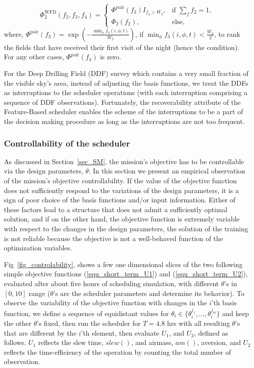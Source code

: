 \documentclass[12pt]{aastex62}
\theoremstyle{definition}
\begin{document}
\begin{equation*}
\Phi_2^{\text{WFD}}(f_2,f_3,f_4) =\begin{cases} \Phi^{\text{pair}}(f_3)I_{f_4> W_2},& \text{if } \sum\limits_{f}{f_2} = 1,\\ \Phi_2(f_2),& \text{else,} \end{cases}
\end{equation*}
where, $\Phi^{\text{pair}}(f_3) = \exp(- \frac{\min_{\phi}f_3(i,\phi,t)}{W_2})$, if $ \min_{\phi}f_3(i,\phi,t) < \frac{W_2}{2}$, to rank the fields that have received their first visit of the night (hence the condition). For any other cases, $\Phi^{\text{pair}}(f_3)$ is zero.

For the Deep Drilling Field (DDF) survey which contains a very small fraction of the visible sky's area, instead of adjusting the basis functions, we treat the DDFs as interruptions to the scheduler operations (with each interruption comprising a sequence of DDF observations). Fortunately, the recoverability attribute of the Feature-Based scheduler enables the scheme of the interruptions to be a part of the decision making procedure as long as the interruptions are not too frequent.

\subsubsection{Controllability of the scheduler}\label{sec_sim_cont}

As discussed in Section~\ref{sec_SM}, the mission's objective has to be controllable via the design parameters, $\theta$. In this section we present an empirical observation of the mission's objective controllability. If the value of the objective function does not sufficiently respond to the variations of the design parameters, it is a sign of poor choice of the basis functions and/or input information. Either of these factors lead to a structure that does not admit a sufficiently optimal solution, and if on the other hand, the objective function is extremely variable with respect to the changes in the design parameters, the solution of the training is not reliable because the objective is not a well-behaved function of the optimization variables.

Fig~\ref{fig_controlability}, shows a few one dimensional slices of the two following simple objective functions (\ref{equ_short_term_U1}) and (\ref{equ_short_term_U2}), evaluated after about five hours of scheduling simulation, with different $\theta$'s in $[0,10]$ range ($\theta$'s are the scheduler parameters and determine its behavior). To observe the variability of the objective function with changes in the $i$'th basis function, we define a sequence of equidistant values for $\theta_i \in \{\theta_i^{j_1},\dots,\theta_i^{j_m}\}$ and keep the other $\theta$'s fixed, then run the scheduler for $T = 4.8$ hrs with all resulting $\theta$'s that are different by the $i$'th element, then evaluate $U_1$, and $U_2$, defined as follows. $U_1$ reflects the slew time, $slew()$, and airmass, $am()$, aversion, and $U_2$ reflects the time-efficiency of the operation by counting the total number of observation.
\end{document}
